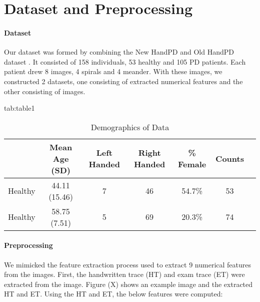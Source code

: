 \documentclass[pmlr,twocolumn,10pt]{jmlr} %
\begin{document}
\section{Dataset and Preprocessing}
\label{sec:Dataset+Preprocessing}

\paragraph{Dataset}
\label{sec:Dataset} Our dataset was formed by combining the New HandPD and Old HandPD dataset \citep{pereira2016new}. It consisted of 158 individuals, 53 healthy and 105 PD patients. Each patient drew 8 images, 4 spirals and 4 meander. With these images, we constructed 2 datasets, one consisting of extracted numerical features and the other consisting of images.

\begin{table*}[hbtp]
\centering 
\floatconts
{tab:table1}
{\caption{Demographics of Data}} 
    {
        \begin{tabular}{lcccccc}
        \toprule
        \bfseries & \bfseries Mean Age (SD) & \bfseries Left Handed & \bfseries Right Handed & \bfseries \% Female & \bfseries Counts \\
        \midrule
        Healthy & 44.11 (15.46) & 7 & 46 & 54.7\% & 53 \\
        Healthy & 58.75 (7.51) & 5 & 69 & 20.3\% & 74 \\
        \bottomrule
        \end{tabular}
    }
\end{table*}

\paragraph{Preprocessing}
\label{sec:Preprocessing} 
We mimicked the feature extraction process used \citep{pereira2016new} to extract 9 numerical features from the images. First, the handwritten trace (HT) and exam trace (ET) were extracted from the image. Figure (X) shows an example image and the extracted HT and ET.  Using the HT and ET, the below features were computed:
\end{document}
